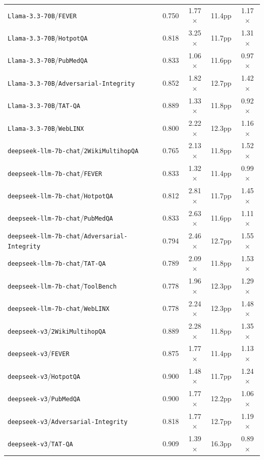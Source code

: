 \begin{longtable}{lcccc}
\texttt{Llama-3.3-70B}/\texttt{FEVER} & 0.750 & 1.77$\times$ & 11.4pp & 1.17$\times$ \\
\texttt{Llama-3.3-70B}/\texttt{HotpotQA} & 0.818 & 3.25$\times$ & 11.7pp & 1.31$\times$ \\
\texttt{Llama-3.3-70B}/\texttt{PubMedQA} & 0.833 & 1.06$\times$ & 11.6pp & 0.97$\times$ \\
\texttt{Llama-3.3-70B}/\texttt{Adversarial-Integrity} & 0.852 & 1.82$\times$ & 12.7pp & 1.42$\times$ \\
\texttt{Llama-3.3-70B}/\texttt{TAT-QA} & 0.889 & 1.33$\times$ & 11.8pp & 0.92$\times$ \\
\texttt{Llama-3.3-70B}/\texttt{WebLINX} & 0.800 & 2.22$\times$ & 12.3pp & 1.16$\times$ \\
\texttt{deepseek-llm-7b-chat}/\texttt{2WikiMultihopQA} & 0.765 & 2.13$\times$ & 11.8pp & 1.52$\times$ \\
\texttt{deepseek-llm-7b-chat}/\texttt{FEVER} & 0.833 & 1.32$\times$ & 11.4pp & 0.99$\times$ \\
\texttt{deepseek-llm-7b-chat}/\texttt{HotpotQA} & 0.812 & 2.81$\times$ & 11.7pp & 1.45$\times$ \\
\texttt{deepseek-llm-7b-chat}/\texttt{PubMedQA} & 0.833 & 2.63$\times$ & 11.6pp & 1.11$\times$ \\
\texttt{deepseek-llm-7b-chat}/\texttt{Adversarial-Integrity} & 0.794 & 2.46$\times$ & 12.7pp & 1.55$\times$ \\
\texttt{deepseek-llm-7b-chat}/\texttt{TAT-QA} & 0.789 & 2.09$\times$ & 11.8pp & 1.53$\times$ \\
\texttt{deepseek-llm-7b-chat}/\texttt{ToolBench} & 0.778 & 1.96$\times$ & 12.3pp & 1.29$\times$ \\
\texttt{deepseek-llm-7b-chat}/\texttt{WebLINX} & 0.778 & 2.24$\times$ & 12.3pp & 1.48$\times$ \\
\texttt{deepseek-v3}/\texttt{2WikiMultihopQA} & 0.889 & 2.28$\times$ & 11.8pp & 1.35$\times$ \\
\texttt{deepseek-v3}/\texttt{FEVER} & 0.875 & 1.77$\times$ & 11.4pp & 1.13$\times$ \\
\texttt{deepseek-v3}/\texttt{HotpotQA} & 0.900 & 1.48$\times$ & 11.7pp & 1.24$\times$ \\
\texttt{deepseek-v3}/\texttt{PubMedQA} & 0.900 & 1.77$\times$ & 12.2pp & 1.06$\times$ \\
\texttt{deepseek-v3}/\texttt{Adversarial-Integrity} & 0.818 & 1.77$\times$ & 12.7pp & 1.19$\times$ \\
\texttt{deepseek-v3}/\texttt{TAT-QA} & 0.909 & 1.39$\times$ & 16.3pp & 0.89$\times$ \\

\end{longtable}
